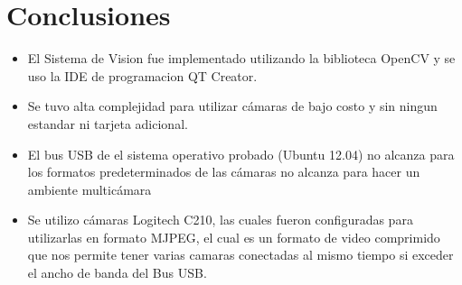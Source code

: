
\chapter{Conclusiones}

\begin{itemize}
\item El Sistema de Vision fue implementado utilizando la biblioteca OpenCV y se uso la IDE de programacion  QT Creator.
\item Se tuvo alta complejidad para utilizar c\'amaras de bajo costo y sin ningun estandar ni tarjeta adicional.
\item El bus USB de el sistema operativo probado (Ubuntu 12.04) no alcanza para los formatos predeterminados de las c\'amaras no alcanza para hacer un ambiente multic\'amara
\item Se utilizo c\'amaras Logitech C210, las cuales fueron configuradas para utilizarlas en formato MJPEG, el cual es un formato de video comprimido que nos permite tener varias camaras conectadas al mismo tiempo si exceder el ancho de banda del Bus USB.
\end{itemize}